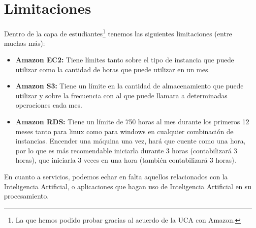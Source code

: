 \section{Limitaciones}
Dentro de la capa de estudiantes\footnote{La que hemos podido probar gracias al acuerdo de la UCA con Amazon.} tenemos las siguientes limitaciones (entre muchas más):
\begin{itemize}
	\item \textbf{Amazon EC2:} Tiene límites tanto sobre el tipo de instancia que puede utilizar como la cantidad de horas que puede utilizar en un mes.
	\item \textbf{Amazon S3:} Tiene un límite en la cantidad de almacenamiento que puede utilizar y sobre la frecuencia con al que puede llamara a determinadas operaciones cada mes.
	\item \textbf{Amazon RDS:} Tiene un límite de 750 horas al mes durante los primeros 12 meses tanto para linux como para windows en cualquier combinación de instancias. Encender una máquina una vez, hará que cuente como una hora, por lo que es más recomendable iniciarla durante 3 horas (contabilizará 3 horas), que iniciarla 3 veces en una hora (también contabilizará 3 horas).
\end{itemize}

En cuanto a servicios, podemos echar en falta aquellos relacionados con la Inteligencia Artificial, o aplicaciones que hagan uso de Inteligencia Artificial en su procesamiento.